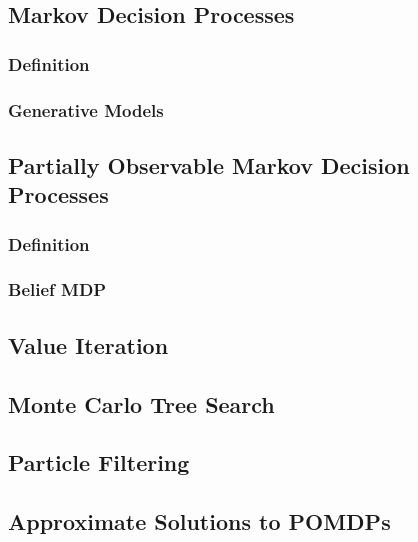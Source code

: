 \subsection{Markov Decision Processes}

\subsubsection{Definition}
\subsubsection{Generative Models}

\subsection{Partially Observable Markov Decision Processes}

\subsubsection{Definition}
\subsubsection{Belief MDP}

\subsection{Value Iteration}

\subsection{Monte Carlo Tree Search}

\subsection{Particle Filtering}

\subsection{Approximate Solutions to POMDPs}
